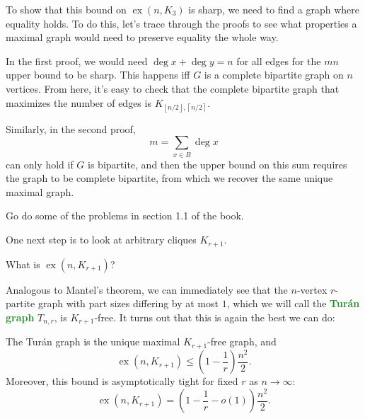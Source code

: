 \documentclass[10pt]{scrartcl}
\providecommand{\opname}{\operatorname}
\providecommand{\vocab}[1]{{\textbf{\textcolor{ForestGreen}{#1}}}}
\providecommand{\ex}{\opname{ex}}
\providecommand{\floor}[1]{\left\lfloor #1\right\rfloor}
\providecommand{\ceil}[1]{\left\lceil #1\right\rceil}
\begin{document}
To show that this bound on $\ex(n, K_3)$ is sharp, we need to find
a graph where equality holds. To do this, let's trace through the proofs
to see what properties a maximal graph would need to preserve
equality the whole way.

In the first proof, we would need $\deg x + \deg y = n$
for all edges for the $mn$ upper bound to be sharp.
This happens iff $G$ is a complete bipartite graph on $n$ vertices.
From here, it's easy to check that the complete bipartite graph
that maximizes the number of edges is $K_{\floor{n/2}, \ceil{n/2}}$.

Similarly, in the second proof,
\[m = \sum_{x\in B}\deg x\]
can only hold if $G$ is bipartite, and then the upper bound on this sum
requires the graph to be complete bipartite, from which we
recover the same unique maximal graph.

\begin{exercise}
	Go do some of the problems in section 1.1 of the book.
\end{exercise}

One next step is to look at arbitrary cliques $K_{r+1}$.
\begin{problem}
	What is $\ex(n, K_{r+1})$?
\end{problem}

Analogous to Mantel's theorem, we can immediately see that
the $n$-vertex $r$-partite graph with part sizes differing by at most $1$,
which we will call the \vocab{Tur\'an graph} $T_{n,r}$,
is $K_{r+1}$-free. It turns out that this is again the best we can do:

\begin{theorem}
	The Tur\'an graph is the unique maximal $K_{r+1}$-free graph, and
	\[\ex(n, K_{r+1})\le \left(1 - \frac1r\right)\frac{n^2}{2}.\]
	Moreover, this bound is asymptotically tight
	for fixed $r$ as $n\to\infty$:
	\[\ex(n, K_{r+1}) = \left(1 - \frac1r - o(1)\right)\frac {n^2}2.\]
\end{theorem}
\end{document}
